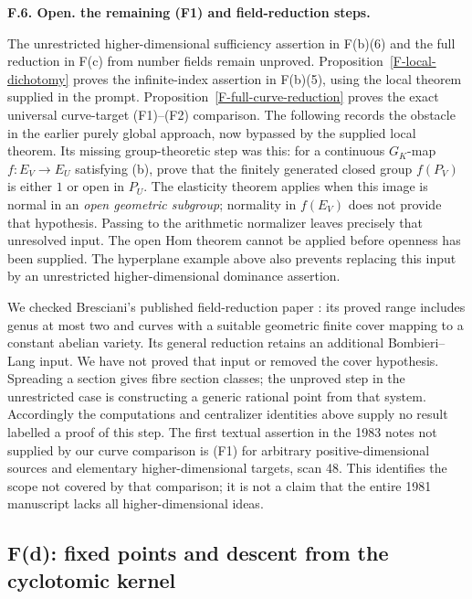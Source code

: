 \documentclass[11pt,oneside]{article}
\makeatletter
\newcounter{statementanchor}
\newenvironment{statement}[3]{%
 \refstepcounter{statementanchor}\def\@currentlabel{#1}%
 \par\addvspace{9pt}\noindent
 \textbf{#1. #2. #3.}\par\nobreak\noindent\ignorespaces
}{\par\addvspace{5pt}}
\makeatother
\begin{document}
\begin{statement}{F.6}{Open}{the remaining (F1) and field-reduction steps}
\label{st:F.6}
\label{F-open-main}
The unrestricted higher-dimensional sufficiency assertion in
F(b)(6) and the full reduction in F(c) from number fields remain
unproved. Proposition~\ref{F-local-dichotomy} proves the
infinite-index assertion in F(b)(5), using the local theorem
supplied in the prompt. Proposition~\ref{F-full-curve-reduction}
proves the exact universal curve-target (F1)--(F2) comparison.
The following records the obstacle in the earlier purely global
approach, now bypassed by the supplied local theorem. Its missing
group-theoretic step was this: for a continuous
$G_K$-map $f:E_V\to E_U$ satisfying (b), prove that the finitely
generated closed group $f(P_V)$ is either $1$ or open in $P_U$.
The elasticity theorem applies when this image is normal in an
\emph{open geometric subgroup}; normality in $f(E_V)$ does not
provide that hypothesis. Passing to the arithmetic normalizer leaves
precisely that unresolved input. The open Hom theorem cannot be
applied before openness has been supplied. The hyperplane example
above also prevents replacing this input by an unrestricted
higher-dimensional dominance assertion.

We checked Bresciani's published field-reduction paper
\cite{F-BrescianiFiniteType}: its proved range includes genus at most
two and curves with a suitable geometric finite cover mapping to a
constant abelian variety. Its general reduction retains an additional
Bombieri--Lang input. We have not proved that input or removed the
cover hypothesis. Spreading a section gives fibre section classes;
the unproved step in the unrestricted case is constructing a generic
rational point from that system. Accordingly the computations and
centralizer identities above supply no result labelled a proof of
this step. The first textual assertion in the 1983 notes not supplied
by our curve comparison is (F1) for arbitrary positive-dimensional
sources and elementary higher-dimensional targets, scan 48. This
identifies the scope not covered by that comparison; it is not a
claim that the entire 1981 manuscript lacks all higher-dimensional
ideas.
\end{statement}

\subsection{F(d): fixed points and descent from the cyclotomic kernel}
\end{document}

